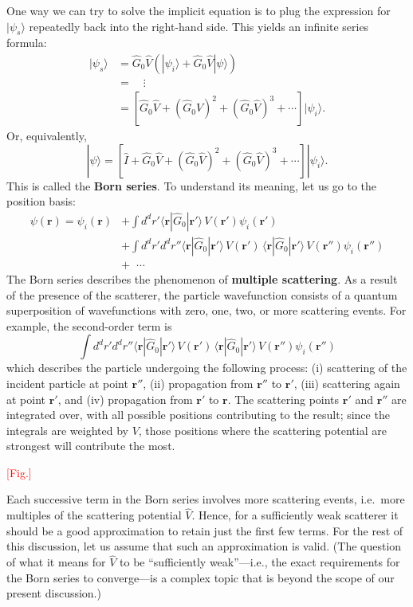 \documentclass[pra,11pt]{revtex4}
\begin{document}
One way we can try to solve the implicit equation is to plug the
expression for $|\psi_s\rangle$ repeatedly back into the right-hand
side.  This yields an infinite series formula:
$$\begin{aligned}|\psi_s\rangle &= \hat{G}_0 \hat{V} \left(|\psi_i\rangle + \hat{G}_0 \hat{V}|\psi\rangle\right) \\ &= \quad \vdots \\ &= \left[\hat{G}_0 \hat{V} + (\hat{G}_0 \hat{V})^2 + (\hat{G}_0 \hat{V})^3 + \cdots\right]|\psi_i\rangle.\end{aligned}$$
Or, equivalently,
$$|\psi\rangle = \left[\hat{I} + \hat{G}_0 \hat{V} + (\hat{G}_0 \hat{V})^2 + (\hat{G}_0 \hat{V})^3 + \cdots\right]|\psi_i\rangle.$$
This is called the \textbf{Born series}.  To understand its meaning,
let us go to the position basis:
$$\begin{aligned}\psi(\mathbf{r}) = \psi_i(\mathbf{r}) &+ \int d^dr' \langle \mathbf{r} | \hat{G}_0 |\mathbf{r}'\rangle\, V(\mathbf{r}') \psi_i(\mathbf{r}') \\ &+ \int d^dr' d^dr'' \langle \mathbf{r} | \hat{G}_0 |\mathbf{r}'\rangle\, V(\mathbf{r}') \, \langle \mathbf{r} | \hat{G}_0 |\mathbf{r}'\rangle \, V(\mathbf{r}'') \psi_i(\mathbf{r}'') \\ &+ \;\;\cdots\end{aligned}$$
The Born series describes the phenomenon of \textbf{multiple
  scattering}.  As a result of the presence of the scatterer, the
particle wavefunction consists of a quantum superposition of
wavefunctions with zero, one, two, or more scattering events.  For
example, the second-order term is
$$\int d^dr' d^dr'' \langle \mathbf{r} | \hat{G}_0 |\mathbf{r}'\rangle\, V(\mathbf{r}') \, \langle \mathbf{r} | \hat{G}_0 |\mathbf{r}'\rangle \, V(\mathbf{r}'') \psi_i(\mathbf{r}'')$$
which describes the particle undergoing the following process: (i)
scattering of the incident particle at point $\mathbf{r}''$, (ii)
propagation from $\mathbf{r}''$ to $\mathbf{r}'$, (iii) scattering
again at point $\mathbf{r}'$, and (iv) propagation from $\mathbf{r}'$
to $\mathbf{r}$.  The scattering points $\mathbf{r}'$ and
$\mathbf{r}''$ are integrated over, with all possible positions
contributing to the result; since the integrals are weighted by $V$,
those positions where the scattering potential are strongest will
contribute the most.

\textcolor{red}{[Fig.]}

Each successive term in the Born series involves more scattering
events, i.e.~more multiples of the scattering potential $\hat{V}$.
Hence, for a sufficiently weak scatterer it should be a good
approximation to retain just the first few terms.  For the rest of
this discussion, let us assume that such an approximation is valid.
(The question of what it means for $\hat{V}$ to be
``sufficiently weak''---i.e., the exact requirements for the Born
series to converge---is a complex topic that is beyond the scope of
our present discussion.)
\end{document}
